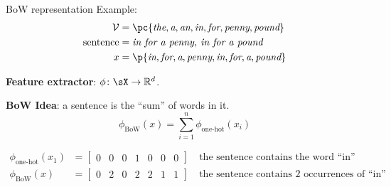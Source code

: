 \documentclass[usenames,dvipsnames,notes,11pt,aspectratio=169]{beamer}
\newcommand{\pdfnote}[1]{}
\newcommand\w[1]{\textit{#1}}
\begin{document}
\begin{frame}
    {BoW representation}
    Example:
    \begin{align*}
        \mathcal{V} &= \pc{\w{the}, \w{a}, \w{an}, \w{in}, \w{for}, \w{penny}, \w{pound}}\\
        \text{sentence} &= \w{in for a penny, in for a pound} \\
        x &= \p{\w{in}, \w{for}, \w{a}, \w{penny}, \w{in}, \w{for}, \w{a}, \w{pound}}
    \end{align*}

    \textbf{Feature extractor}: $\phi\colon \sX \rightarrow \mathbb{R}^d$.
    \pause

    \textbf{BoW Idea}: a sentence is the ``sum'' of words in it.
    $$
    \phi_{\text{BoW}}(x) = \sum_{i=1}^n \phi_{\text{one-hot}}(x_i)
    $$
    \vspace{-1em}

    \begin{align*}
        \phi_{\text{one-hot}}(x_1) &= \begin{bmatrix} 0 & 0 & 0 & 1 & 0 & 0 & 0 \end{bmatrix}
        \quad \text{the sentence contains the word ``in''}\\
        \phi_{\text{BoW}}(x)  &= \begin{bmatrix} 0 & 2 & 0 & 2 & 2 & 1 & 1 \end{bmatrix}
        \quad \text{the sentence contains 2 occurrences of ``in''}\\
    \end{align*}
\end{frame}

%
%
\end{document}
